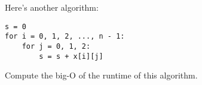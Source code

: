Here's another algorithm:
\begin{Verbatim}[frame=single, fontsize=\small]
s = 0
for i = 0, 1, 2, ..., n - 1:
    for j = 0, 1, 2:
        s = s + x[i][j]
\end{Verbatim}
Compute the big-O of the runtime of this algorithm.
